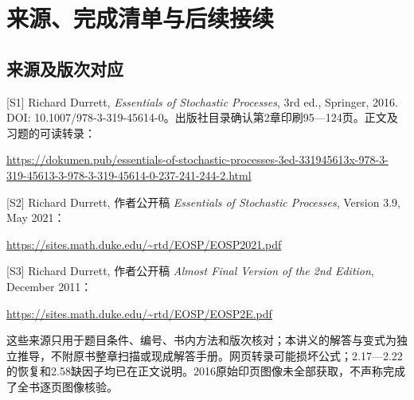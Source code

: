 \documentclass[12pt,a4paper,UTF8,fontset=fandol]{ctexart}
\begin{document}
\section{来源、完成清单与后续接续}\label{ux6765ux6e90ux5b8cux6210ux6e05ux5355ux4e0eux540eux7eedux63a5ux7eed}

\subsection{来源及版次对应}\label{ux6765ux6e90ux53caux7248ux6b21ux5bf9ux5e94}

{[}S1{]} Richard Durrett, \emph{Essentials of Stochastic Processes}, 3rd
ed., Springer, 2016. DOI:
10.1007/978-3-319-45614-0。出版社目录确认第2章印刷95---124页。正文及习题的可读转录：

\url{https://dokumen.pub/essentials-of-stochastic-processes-3ed-331945613x-978-3-319-45613-3-978-3-319-45614-0-237-241-244-2.html}

{[}S2{]} Richard Durrett, 作者公开稿 \emph{Essentials of Stochastic
Processes}, Version 3.9, May 2021：

\url{https://sites.math.duke.edu/~rtd/EOSP/EOSP2021.pdf}

{[}S3{]} Richard Durrett, 作者公开稿 \emph{Almost Final Version of the
2nd Edition}, December 2011：

\url{https://sites.math.duke.edu/~rtd/EOSP/EOSP2E.pdf}

这些来源只用于题目条件、编号、书内方法和版次核对；本讲义的解答与变式为独立推导，不附原书整章扫描或现成解答手册。网页转录可能损坏公式；2.17---2.22的恢复和2.58缺因子均已在正文说明。2016原始印页图像未全部获取，不声称完成了全书逐页图像核验。
\end{document}

